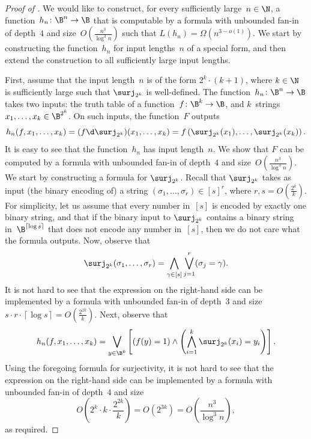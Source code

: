 \documentclass{toc}
\begin{document}
\begin{proof}[Proof of ]
We would like to construct, for every sufficiently large~$n\in\N$,
a function~$h_{n}\colon\B^{n}\to\B$ that is computable by a formula
with unbounded fan-in of depth~$4$ and size~$O(\frac{n^{3}}{\log^{3}n})$
such that $L(h_{n})=\Omega(n^{3-o(1)})$. We start by constructing
the function~$h_{n}$ for input lengths~$n$ of a special form,
and then extend the construction to all sufficiently large input lengths.

First, assume that the input length~$n$ is of the form $2^{k}\cdot(k+1)$,
where $k\in\N$ is sufficiently large such that $\surj_{2^{k}}$ is
well-defined. The function~$h_{n}\colon\B^{n}\to\B$ takes two inputs:
the truth table of a function~$f\colon\B^{k}\to\B$, and $k$~strings
$x_{1},\ldots,x_{k}\in\B^{2^{k}}$. On such inputs, the function~$F$
outputs 
\[
h_{n}(f,x_{1},\ldots,x_{k})=(f\d\surj_{2^{k}})(x_{1},\ldots,x_{k})=f\left(\surj_{2^{k}}(x_{1}),\ldots,\surj_{2^{k}}(x_{k})\right).
\]
It is easy to see that the function~$h_{n}$ has input length~$n$.
We show that $F$ can be computed by a formula with unbounded fan-in
of depth~$4$ and size~$O(\frac{n^{3}}{\log^{3}n})$. We start by
constructing a formula for $\surj_{2^{k}}$. Recall that $\surj_{2^{k}}$
takes as input (the binary encoding of) a string $(\sigma_{1},\ldots,\sigma_{r})\in\left[s\right]^{r}$,
where $r,s=O(\frac{2^{k}}{k})$. For simplicity, let us assume that
every number in~$\left[s\right]$ is encoded by exactly one binary
string, and that if the binary input to $\surj_{2^{k}}$ contains
a binary string in~$\B^{\left\lceil \log s\right\rceil }$ that does
not encode any number in~$\left[s\right]$, then we do not care what
the formula outputs. Now, observe that 
\begin{equation}
\surj_{2^{k}}(\sigma_{1},\ldots,\sigma_{r})=\bigwedge_{\gamma\in\left[s\right]}\bigvee_{j=1}^{r}(\sigma_{j}=\gamma).\label{eq:surjectivity-formula}
\end{equation}
It is not hard to see that the expression on the right-hand side can
be implemented by a formula with unbounded fan-in of depth~$3$ and
size $s\cdot r\cdot\left\lceil \log s\right\rceil =O\!\left(\frac{2^{2k}}{k}\right)$.
Next, observe that 
\[
h_{n}(f,x_{1},\ldots,x_{k})=\bigvee_{y\in\B^{k}}\left[\left(f(y)=1\right)\wedge\left(\bigwedge_{i=1}^{k}\surj_{2^{k}}(x_{i})=y_{i}\right)\right].
\]
Using the foregoing formula for surjectivity, it is not hard to see
that the expression on the right-hand side can be implemented by a
formula with unbounded fan-in of depth~$4$ and size 
\[
O\!\left(2^{k}\cdot k\cdot\frac{2^{2k}}{k}\right)=O\!\left(2^{3k}\right)=O\!\left(\frac{n^{3}}{\log^{3}n}\right),
\]
as required.


\end{proof}
\end{document}
